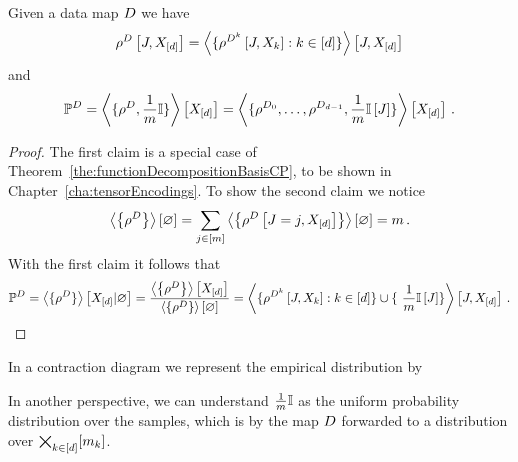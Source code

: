 \begin{theorem}\label{the:empCPRep}
	Given a data map $D$ we have
	\begin{align*}
		\rho^{D}\left[J,X_{[d]}\right]  
		= \left\langle 
		\{\rho^{D^{k}}\left[J,X_{k}\right] : k\in[d] \} 
		\right\rangle \left[ J,X_{[d]} \right] 
	\end{align*}
	and
	\begin{align*}
	\mathbb{P}^{D} = \left\langle \{\rho^{D}, \frac{1}{m}\mathbb{I} \}\right\rangle \left[ X_{[d]} \right] 
	= \left\langle \{\rho^{D_{0}},\ldots,\rho^{D_{d-1}}, \frac{1}{m}\mathbb{I}\left[J\right] \}\right\rangle \left[ X_{[d]} \right] \, . 
	\end{align*}
\end{theorem}
\begin{proof}
	The first claim is a special case of Theorem~\ref{the:functionDecompositionBasisCP}, to be shown in Chapter~\ref{cha:tensorEncodings}.
	To show the second claim we notice
		\[ \left\langle \left\{\rho^{D}\right\}\right\rangle \left[ \varnothing \right] = \sum_{j\in[m]} \left\langle \left\{\rho^{D}\left[J=j,X_{[d]}\right]\right\}\right\rangle \left[ \varnothing \right] = m \,  . \]
	With the first claim it follows that
	\begin{align*}
		\empdistribution 
		 = \normationofwrt{\{\datacore\}}{\shortcatvariables}{\varnothing}
		 = \frac{\sbcontractionof{\datacore}{\shortcatvariables}}{\sbcontraction{\datacore}} 
		 =  \contractionof{
		\{\rencodingofat{\datamap^{\atomenumerator}}{\datvariable,\catvariableof{\atomenumerator}} : \atomenumeratorin \} \cup \{ \frac{1}{\datanum} \onesat{\datvariable} \}
		}{\datvariable,\shortcatvariables}  \, . 
	\end{align*}
\end{proof}

In a contraction diagram we represent the empirical distribution by
\begin{center}
	
\end{center}

In another perspective, we can understand $\frac{1}{m}\mathbb{I}$ as the uniform probability distribution over the samples, which is by the map $D$ forwarded to a distribution over $\bigtimes_{k\in[d]}[m_{k}]$.















